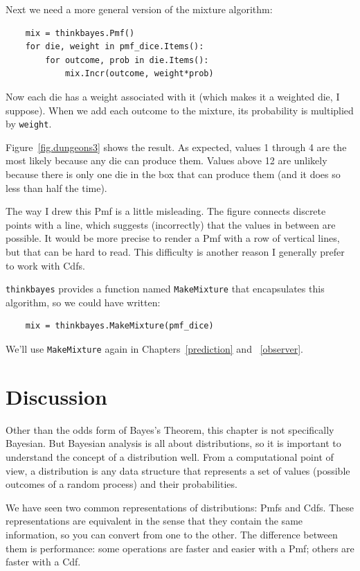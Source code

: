 \documentclass[12pt]{book}
\begin{document}
Next we need a more general version of the mixture algorithm:

\begin{verbatim}
    mix = thinkbayes.Pmf()
    for die, weight in pmf_dice.Items():
        for outcome, prob in die.Items():
            mix.Incr(outcome, weight*prob)
\end{verbatim}

Now each die has a weight associated with it (which makes it a
weighted die, I suppose).  When we add each outcome to the mixture,
its probability is multiplied by {\tt weight}.

Figure~\ref{fig.dungeons3} shows the result.  As expected, values 1
through 4 are the most likely because any die can produce them.
Values above 12 are unlikely because there is only one die in the box
that can produce them (and it does so less than half the time).

The way I drew this Pmf is a little misleading.  The figure connects
discrete points with a line, which suggests (incorrectly) that the
values in between are possible.  It would be more precise to render a
Pmf with a row of vertical lines, but that can be hard to read.  This
difficulty is another reason I generally prefer to work with Cdfs.

{\tt thinkbayes} provides a function named {\tt MakeMixture}
that encapsulates this algorithm, so we could have written:

\begin{verbatim}
    mix = thinkbayes.MakeMixture(pmf_dice)
\end{verbatim}

We'll use {\tt MakeMixture} again in Chapters~\ref{prediction} and
~\ref{observer}.


\section{Discussion}

Other than the odds form of Bayes's Theorem, this chapter is not
specifically Bayesian.  But Bayesian analysis is all about
distributions, so it is important to understand the concept of a
distribution well.  From a computational point of view, a distribution
is any data structure that represents a set of values (possible
outcomes of a random process) and their probabilities.

We have seen two common representations of distributions: Pmfs
and Cdfs.  These representations are equivalent in the sense that
they contain the same information, so you can convert from one
to the other.  The difference between them is performance: some
operations are faster and easier with a Pmf; others are faster
with a Cdf.
\end{document}
